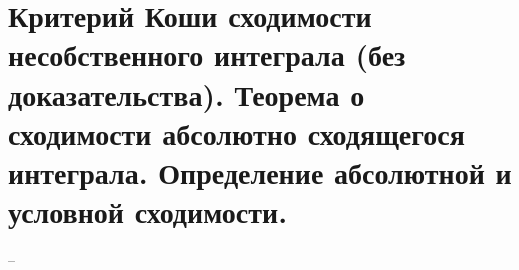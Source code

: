 \section{Критерий Коши сходимости несобственного интеграла (без доказательства). Теорема о сходимости абсолютно сходящегося интеграла. Определение абсолютной и условной сходимости.}
--
\newline